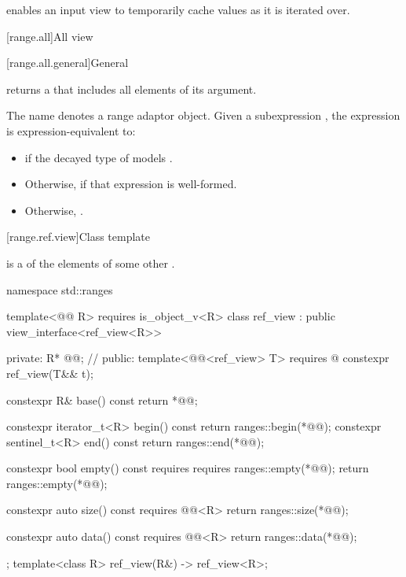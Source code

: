 \pnum
\begin{note}
 enables an input view
to temporarily cache values as it is iterated over.
\end{note}

[range.all]{All view}

[range.all.general]{General}

\pnum
{}%
 returns a  that includes all elements of
its  argument.

\pnum
The name  denotes a
range adaptor object.
Given a subexpression , the expression
 is expression-equivalent to:
\begin{itemize}
\item {} if the decayed type of 
models .

\item Otherwise,  if that expression is well-formed.

\item Otherwise, .
\end{itemize}

[range.ref.view]{Class template }

\pnum
{} is a  of the elements of some other .
%
\begin{codeblock}
namespace std::ranges {
  template<@@ R>
    requires is_object_v<R>
  class ref_view : public view_interface<ref_view<R>> {
  private:
    R* @@;                      // \expos
  public:
    template<@@<ref_view> T>
      requires @\seebelow@
    constexpr ref_view(T&& t);

    constexpr R& base() const { return *@@; }

    constexpr iterator_t<R> begin() const { return ranges::begin(*@@); }
    constexpr sentinel_t<R> end() const { return ranges::end(*@@); }

    constexpr bool empty() const
      requires requires { ranges::empty(*@@); }
    { return ranges::empty(*@@); }

    constexpr auto size() const requires @@<R>
    { return ranges::size(*@@); }

    constexpr auto data() const requires @@<R>
    { return ranges::data(*@@); }
  };
  template<class R>
    ref_view(R&) -> ref_view<R>;
}
\end{codeblock}

